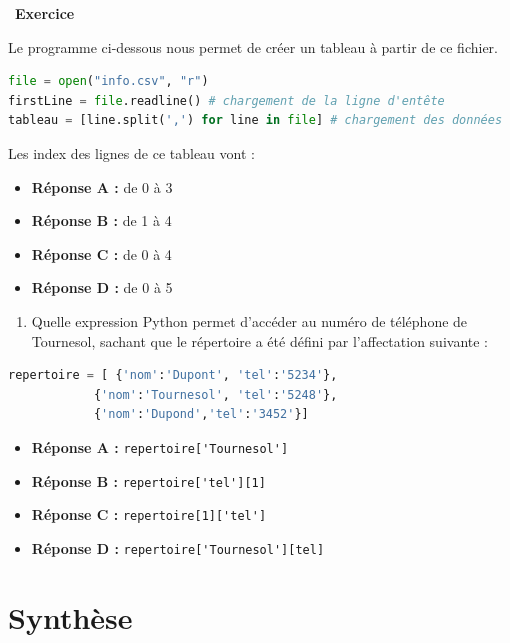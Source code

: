 \documentclass[
  11pt,
]{article}
\newcommand{\passthrough}[1]{#1}
\providecommand{\tightlist}{%
  \setlength{\itemsep}{0pt}\setlength{\parskip}{0pt}}
\newcounter{exo}
\newenvironment{exercice}[1]
{\par \medskip   \addtocounter{exo}{1} \noindent  
\begin{bclogo}[arrondi =0.1,   noborder = true, logo=\bccrayon, marge=4]{~\textbf{Exercice} \textbf{\theexo} {\itshape #1} }  \par}
{
\end{bclogo}
 \par \bigskip }
\newcounter{def}
\newcounter{prog}
\begin{document}
\begin{exercice}{}
Le programme ci-dessous nous permet de créer un tableau à partir de ce
fichier.

\begin{lstlisting}[language=Python]
file = open("info.csv", "r")
firstLine = file.readline() # chargement de la ligne d'entête
tableau = [line.split(',') for line in file] # chargement des données
\end{lstlisting}

Les index des lignes de ce tableau vont :

\begin{itemize}
\tightlist
\item
  \textbf{Réponse A :} de 0 à 3
\item
  \textbf{Réponse B :} de 1 à 4
\item
  \textbf{Réponse C :} de 0 à 4
\item
  \textbf{Réponse D :} de 0 à 5
\end{itemize}

\begin{enumerate}
\def\labelenumi{\arabic{enumi}.}
\setcounter{enumi}{2}
\tightlist
\item
  Quelle expression Python permet d'accéder au numéro de téléphone de
  Tournesol, sachant que le répertoire a été défini par l'affectation
  suivante :
\end{enumerate}

\begin{lstlisting}[language=Python]
repertoire = [ {'nom':'Dupont', 'tel':'5234'},
            {'nom':'Tournesol', 'tel':'5248'}, 
            {'nom':'Dupond','tel':'3452'}]
\end{lstlisting}

\begin{itemize}
\tightlist
\item
  \textbf{Réponse A :} \passthrough{\lstinline!repertoire['Tournesol']!}
\item
  \textbf{Réponse B :} \passthrough{\lstinline!repertoire['tel'][1]!}
\item
  \textbf{Réponse C :} \passthrough{\lstinline!repertoire[1]['tel']!}
\item
  \textbf{Réponse D :}
  \passthrough{\lstinline!repertoire['Tournesol'][tel]!}
\end{itemize}

\end{exercice}

\hypertarget{synthuxe8se}{%
\section{Synthèse}\label{synthuxe8se}}
\end{document}

